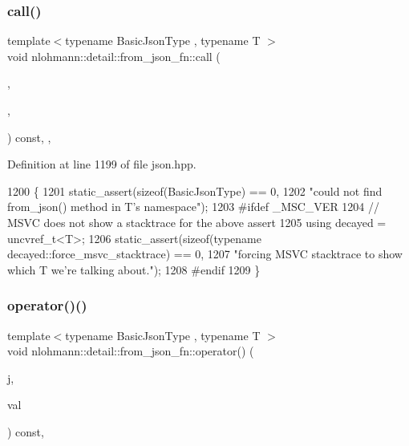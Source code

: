 \subsubsection{\texorpdfstring{call()}{call()}\hspace{0.1cm}{\footnotesize\ttfamily [2/2]}}
{\footnotesize\ttfamily template$<$typename Basic\+Json\+Type , typename T $>$ \\
void nlohmann\+::detail\+::from\+\_\+json\+\_\+fn\+::call (\begin{DoxyParamCaption}\item[{const Basic\+Json\+Type \&}]{,  }\item[{T \&}]{,  }\item[{\hyperlink{structnlohmann_1_1detail_1_1priority__tag}{priority\+\_\+tag}$<$ 0 $>$}]{ }\end{DoxyParamCaption}) const\hspace{0.3cm}{\ttfamily [inline]}, {\ttfamily [private]}, {\ttfamily [noexcept]}}



Definition at line 1199 of file json.\+hpp.


\begin{DoxyCode}
1200     \{
1201         static\_assert(\textcolor{keyword}{sizeof}(BasicJsonType) == 0,
1202                       \textcolor{stringliteral}{"could not find from\_json() method in T's namespace"});
1203 \textcolor{preprocessor}{#ifdef \_MSC\_VER}
1204         \textcolor{comment}{// MSVC does not show a stacktrace for the above assert}
1205         \textcolor{keyword}{using} decayed = uncvref\_t<T>;
1206         static\_assert(\textcolor{keyword}{sizeof}(\textcolor{keyword}{typename} decayed::force\_msvc\_stacktrace) == 0,
1207                       \textcolor{stringliteral}{"forcing MSVC stacktrace to show which T we're talking about."});
1208 \textcolor{preprocessor}{#endif}
1209     \}
\end{DoxyCode}
\mbox{\label{structnlohmann_1_1detail_1_1from__json__fn_a48e82ad9d244fdf249caa970a253e214}} 
\subsubsection{\texorpdfstring{operator()()}{operator()()}}
{\footnotesize\ttfamily template$<$typename Basic\+Json\+Type , typename T $>$ \\
void nlohmann\+::detail\+::from\+\_\+json\+\_\+fn\+::operator() (\begin{DoxyParamCaption}\item[{const Basic\+Json\+Type \&}]{j,  }\item[{T \&}]{val }\end{DoxyParamCaption}) const\hspace{0.3cm}{\ttfamily [inline]}, {\ttfamily [noexcept]}}



